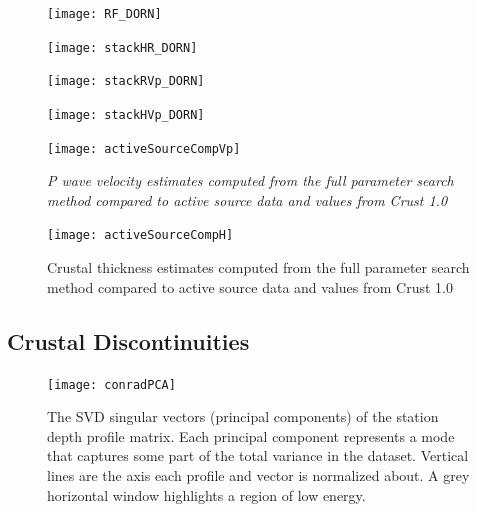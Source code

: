 \documentclass[draft, 12pt]{article}
\begin{document}
\begin{figure}
  \centering
  \texttt{[image: RF\_DORN]}
  \caption{}
  \label{fig:RF_DORN}
\end{figure}


\begin{figure}
  \centering
  \texttt{[image: stackHR\_DORN]}
  \caption{}
  \label{fig:HR_DORN}
\end{figure}

\begin{figure}
  \centering
  \texttt{[image: stackRVp\_DORN]}
  \caption{}
  \label{fig:RVp_DORN}
\end{figure}

\begin{figure}
  \centering
  \texttt{[image: stackHVp\_DORN]}
  \caption{}
  \label{fig:HVp_DORN}
\end{figure}

\begin{figure}
  \centering
  \texttt{[image: activeSourceCompVp]}
  \caption{\it{P} wave velocity estimates computed from the full parameter search method compared to active source data and values from Crust 1.0}
  \label{fig:activeVp}
\end{figure}

\begin{figure}
  \centering
  \texttt{[image: activeSourceCompH]}
  \caption{Crustal thickness estimates computed from the full parameter search method compared to active source data and values from Crust 1.0}
  \label{fig:activeH}
\end{figure}


\subsection{Crustal Discontinuities}

\begin{figure}
  \centering
  \texttt{[image: conradPCA]}
  \caption{The SVD singular vectors (principal components) of the station depth profile matrix. Each principal component represents a mode that captures some part of the total variance in the dataset. Vertical lines are the axis each profile and vector is normalized about. A grey horizontal window highlights a region of low energy.}
  \label{fig:conradPCA}
\end{figure}
\end{document}
